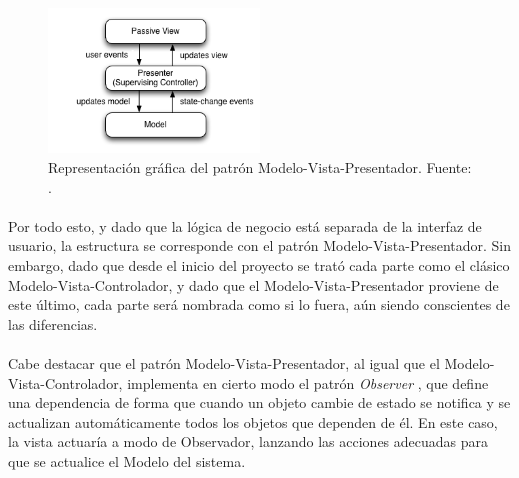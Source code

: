 \documentclass{subfiles}
\begin{document}
        \begin{figure}
        \centering
        \includegraphics[width=0.5\textwidth]{img/mvp.png}
        \caption[Representación gráfica del patrón Modelo-Vista-Presentador.]{Representación gráfica del patrón Modelo-Vista-Presentador. Fuente: .}
        \label{fig:mvp}
        \end{figure}

        \paragraph{}
        Por todo esto, y dado que la lógica de negocio está separada de la interfaz de usuario, la estructura se corresponde con el patrón Modelo-Vista-Presentador. Sin embargo, dado que desde el inicio del proyecto se trató cada parte como el clásico Modelo-Vista-Controlador, y dado que el Modelo-Vista-Presentador proviene de este último, cada parte será nombrada como si lo fuera, aún siendo conscientes de las diferencias.

        \paragraph{}
        Cabe destacar que el patrón Modelo-Vista-Presentador, al igual que el Modelo-Vista-Controlador, implementa en cierto modo el patrón \textit{Observer} \cite{book:gamma_erich_patronesdediseno}, que define una dependencia de forma que cuando un objeto cambie de estado se notifica y se actualizan automáticamente todos los objetos que dependen de él. En este caso, la vista actuaría a modo de Observador, lanzando las acciones adecuadas para que se actualice el Modelo del sistema.
\end{document}
